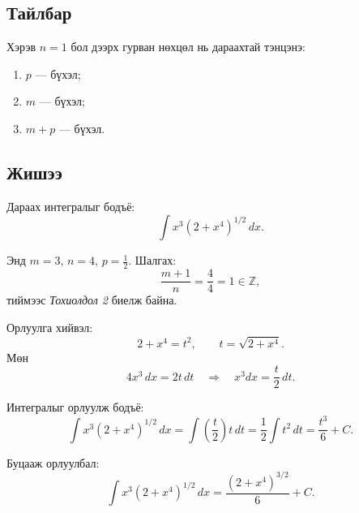 \subsection*{Тайлбар}
Хэрэв $n=1$ бол дээрх гурван нөхцөл нь дараахтай тэнцэнэ:
\begin{enumerate}
\item $p$ — бүхэл;
\item $m$ — бүхэл;
\item $m+p$ — бүхэл.
\end{enumerate}

\subsection*{Жишээ}
Дараах интегралыг бодъё:
\[
\int x^3(2+x^4)^{1/2}\,dx.
\]

Энд $m=3$, $n=4$, $p=\frac12$. Шалгах:
\[
\frac{m+1}{n} = \frac{4}{4} = 1 \in \mathbb{Z},
\]
тиймээс \emph{Тохиолдол 2} биелж байна.

Орлуулга хийвэл:
\[
2 + x^4 = t^2, \qquad t = \sqrt{2+x^4}.
\]
Мөн
\[
4x^3\,dx = 2t\,dt \quad\Rightarrow\quad x^3dx = \frac{t}{2}\,dt.
\]

Интегралыг орлуулж бодъё:
\[
\int x^3(2+x^4)^{1/2}\,dx
= \int \left( \frac{t}{2}\right)t\,dt
= \frac12\int t^2 \, dt
= \frac{t^3}{6} + C.
\]

Буцааж орлуулбал:
\[
\boxed{
\int x^3(2+x^4)^{1/2}\,dx
= \frac{(2+x^4)^{3/2}}{6} + C.
}
\]
\newpage

